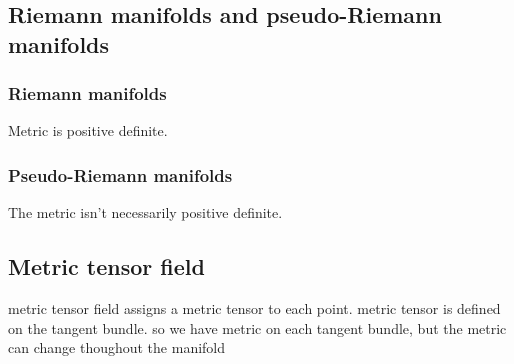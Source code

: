 
\subsection{Riemann manifolds and pseudo-Riemann manifolds}

\subsubsection{Riemann manifolds}

Metric is positive definite.

\subsubsection{Pseudo-Riemann manifolds}

The metric isn't necessarily positive definite.


\subsection{Metric tensor field}

metric tensor field assigns a metric tensor to each point. metric tensor is defined on the tangent bundle.
so we have metric on each tangent bundle, but the metric can change thoughout the manifold


